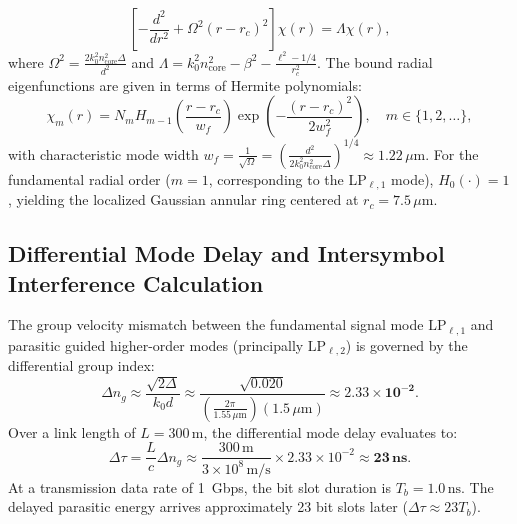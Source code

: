 \documentclass[11pt,a4paper]{article}
\begin{document}
\begin{equation}
\left[ - \frac{d^2}{dr^2} + \Omega^2 (r - r_c)^2 \right] \chi(r) = \Lambda \chi(r),
\label{eq:app_harmonic_oscillator}
\end{equation}
where $\Omega^2 = \frac{2 k_0^2 n_{\text{core}}^2 \Delta}{d^2}$ and $\Lambda = k_0^2 n_{\text{core}}^2 - \beta^2 - \frac{\ell^2 - 1/4}{r_c^2}$. The bound radial eigenfunctions are given in terms of Hermite polynomials:
\begin{equation}
\chi_m(r) = N_m H_{m-1}\left( \frac{r - r_c}{w_f} \right) \exp\left( - \frac{(r - r_c)^2}{2 w_f^2} \right), \quad m \in \{1, 2, \dots\},
\label{eq:app_hermite_modes}
\end{equation}
with characteristic mode width $w_f = \frac{1}{\sqrt{\Omega}} = (\frac{d^2}{2 k_0^2 n_{\text{core}}^2 \Delta})^{1/4} \approx 1.22\,\mu\text{m}$. For the fundamental radial order ($m=1$, corresponding to the LP$_{\ell, 1}$ mode), $H_0(\cdot) = 1$, yielding the localized Gaussian annular ring centered at $r_c = 7.5\,\mu\text{m}$.

\subsection{Differential Mode Delay and Intersymbol Interference Calculation}

The group velocity mismatch between the fundamental signal mode $\text{LP}_{\ell, 1}$ and parasitic guided higher-order modes (principally $\text{LP}_{\ell, 2}$) is governed by the differential group index:
\begin{equation}
\Delta n_g \approx \frac{\sqrt{2\Delta}}{k_0 d} \approx \frac{\sqrt{0.020}}{\left( \frac{2\pi}{1.55\,\mu\text{m}} \right) (1.5\,\mu\text{m})} \approx \mathbf{2.33 \times 10^{-2}}.
\label{eq:app_delta_ng_eval}
\end{equation}
Over a link length of $L = 300\,\text{m}$, the differential mode delay evaluates to:
\begin{equation}
\Delta \tau = \frac{L}{c} \Delta n_g \approx \frac{300\,\text{m}}{3 \times 10^8\,\text{m/s}} \times 2.33 \times 10^{-2} \approx \mathbf{23\,\text{ns}}.
\label{eq:app_dmd_result}
\end{equation}
At a transmission data rate of 1~Gbps, the bit slot duration is $T_b = 1.0\,\text{ns}$. The delayed parasitic energy arrives approximately 23 bit slots later ($\Delta \tau \approx 23 T_b$).
\end{document}
